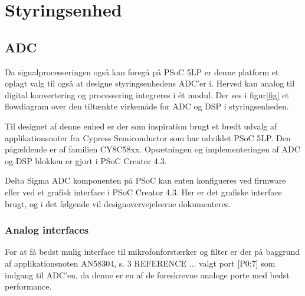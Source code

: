 \section{Styringsenhed}\label{sec:Styringsenhed:design}
\subsection{ADC}

Da signalprocesseringen også kan foregå på PSoC 5LP er denne platform et oplagt valg til også at designe styringsenhedens ADC'er i. Herved kan analog til digital konvertering og processering integreres i ét modul. Der ses i figur\tbr \ref{fig} et flowdiagram over den tiltænkte virkemåde for ADC og DSP i styringsenheden. 

Til designet af denne enhed er der som inspiration brugt et bredt udvalg af applikationsnoter fra Cypress Semiconductor som har udviklet PSoC 5LP. Den pågældende er af familien CY8C58xx. Opsætningen og implementeringen af ADC og DSP blokken er gjort i PSoC Creator 4.3. 

Delta Sigma ADC komponenten på PSoC kan enten konfigueres ved firmware eller ved et grafisk interface i PSoC Creator 4.3. Her er det grafiske interface brugt, og i det følgende vil designovervejelserne dokumenteres.

\subsubsection{Analog interfaces}
For at få bedst mulig interface til mikrofonforstærker og filter er der på baggrund af applikationsnoten AN58304, s. 3 \tbr REFERENCE  ... valgt port [P0:7] som indgang til ADC'en, da denne er en af de foreskrevne analoge porte med bedst performance. 

